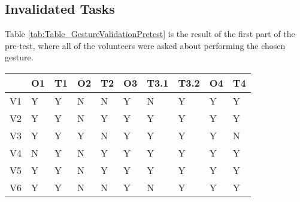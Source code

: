 \subsection{Invalidated Tasks} \label{sec:results_invalid_tasks}
    Table \ref{tab:Table_GestureValidationPretest} is the result of the first part of the pre-test, where all of the volunteers were asked about performing the chosen gesture.

    \begin{table}[ht]
    \begin{tabular}{|l|l|l|l|l|l|l|l|l|l|}
    \hline
    \cellcolor[HTML]{FFFFFF} & O1                        & T1                        & O2                        & T2                        & O3                        & T3.1                      & T3.2                      & O4                        & T4                        \\ \hline
    V1                       & \cellcolor[HTML]{D6FDD5}Y & \cellcolor[HTML]{D6FDD5}Y & \cellcolor[HTML]{FFE7E6}N & \cellcolor[HTML]{FFE7E6}N & \cellcolor[HTML]{D6FDD5}Y & \cellcolor[HTML]{FFE7E6}N & \cellcolor[HTML]{D6FDD5}Y & \cellcolor[HTML]{D6FDD5}Y & \cellcolor[HTML]{D6FDD5}Y \\ \hline
    V2                       & \cellcolor[HTML]{D6FDD5}Y & \cellcolor[HTML]{D6FDD5}Y & \cellcolor[HTML]{FFE7E6}N & \cellcolor[HTML]{D6FDD5}Y & \cellcolor[HTML]{D6FDD5}Y & \cellcolor[HTML]{D6FDD5}Y & \cellcolor[HTML]{D6FDD5}Y & \cellcolor[HTML]{D6FDD5}Y & \cellcolor[HTML]{D6FDD5}Y \\ \hline
    V3                       & \cellcolor[HTML]{D6FDD5}Y & \cellcolor[HTML]{D6FDD5}Y & \cellcolor[HTML]{D6FDD5}Y & \cellcolor[HTML]{FFE7E6}N & \cellcolor[HTML]{D6FDD5}Y & \cellcolor[HTML]{D6FDD5}Y & \cellcolor[HTML]{D6FDD5}Y & \cellcolor[HTML]{D6FDD5}Y & \cellcolor[HTML]{FFE7E6}N \\ \hline
    V4                       & \cellcolor[HTML]{FFE7E6}N & \cellcolor[HTML]{D6FDD5}Y & \cellcolor[HTML]{FFE7E6}N & \cellcolor[HTML]{D6FDD5}Y & \cellcolor[HTML]{D6FDD5}Y & \cellcolor[HTML]{D6FDD5}Y & \cellcolor[HTML]{D6FDD5}Y & \cellcolor[HTML]{D6FDD5}Y & \cellcolor[HTML]{D6FDD5}Y \\ \hline
    V5                       & \cellcolor[HTML]{D6FDD5}Y & \cellcolor[HTML]{D6FDD5}Y & \cellcolor[HTML]{FFE7E6}N & \cellcolor[HTML]{D6FDD5}Y & \cellcolor[HTML]{D6FDD5}Y & \cellcolor[HTML]{D6FDD5}Y & \cellcolor[HTML]{D6FDD5}Y & \cellcolor[HTML]{D6FDD5}Y & \cellcolor[HTML]{D6FDD5}Y \\ \hline
    V6                       & \cellcolor[HTML]{D6FDD5}Y & \cellcolor[HTML]{D6FDD5}Y & \cellcolor[HTML]{FFE7E6}N & \cellcolor[HTML]{FFE7E6}N & \cellcolor[HTML]{D6FDD5}Y & \cellcolor[HTML]{FFE7E6}N & \cellcolor[HTML]{D6FDD5}Y & \cellcolor[HTML]{D6FDD5}Y & \cellcolor[HTML]{D6FDD5}Y \\ \hline

\end{tabular}
\end{table}
